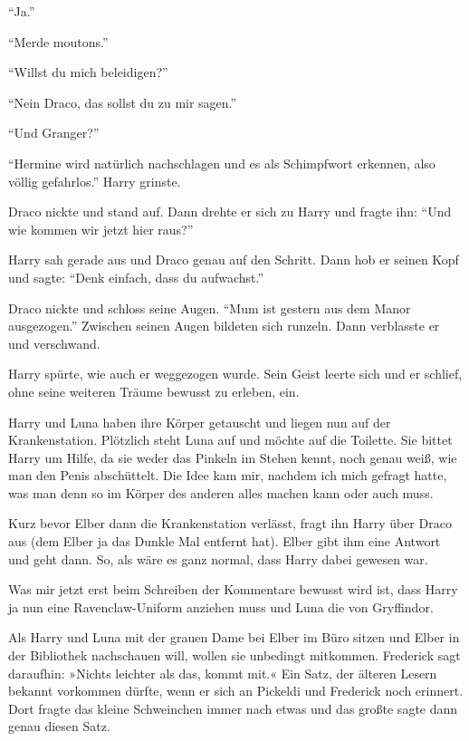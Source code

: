 \enquote{Ja.}

\enquote{Merde moutons.}

\enquote{Willst du mich beleidigen?}

\enquote{Nein Draco, das sollst du zu mir sagen.}

\enquote{Und Granger?}

\enquote{Hermine wird natürlich nachschlagen und es als Schimpfwort erkennen, also völlig gefahrlos.} Harry grinste.

Draco nickte und stand auf. Dann drehte er sich zu Harry und fragte ihn: \enquote{Und wie kommen wir jetzt hier raus?}

Harry sah gerade aus und Draco genau auf den Schritt. Dann hob er seinen Kopf und sagte: \enquote{Denk einfach, dass du aufwachst.}

Draco nickte und schloss seine Augen. \enquote{Mum ist gestern aus dem Manor ausgezogen.} Zwischen seinen Augen bildeten sich runzeln. Dann verblasste er und verschwand.

Harry spürte, wie auch er weggezogen wurde. Sein Geist leerte sich und er schlief, ohne seine weiteren Träume bewusst zu erleben, ein.




\begin{kommentar}
Harry und Luna haben ihre Körper getauscht und liegen nun auf der Krankenstation. Plötzlich steht Luna auf und möchte auf die Toilette. Sie bittet Harry um Hilfe, da sie weder das Pinkeln im Stehen kennt, noch genau weiß, wie man den Penis abschüttelt. Die Idee kam mir, nachdem ich  mich gefragt hatte, was man denn so im Körper des anderen alles machen kann oder auch muss.
\end{kommentar}

\begin{kommentar}
Kurz bevor Elber dann die Krankenstation verlässt, fragt ihn Harry über Draco aus (dem Elber ja das Dunkle Mal entfernt hat). Elber gibt ihm eine Antwort und geht dann. So, als wäre es ganz normal, dass Harry dabei gewesen war.
\end{kommentar}

\begin{kommentar}
Was mir jetzt erst beim Schreiben der Kommentare bewusst wird ist, dass Harry ja nun eine Ravenclaw-Uniform anziehen muss und Luna die von Gryffindor.
\end{kommentar}

\begin{kommentar}
Als Harry und Luna mit der grauen Dame bei Elber im Büro sitzen und Elber in der Bibliothek nachschauen will, wollen sie unbedingt mitkommen. Frederick sagt daraufhin: »Nichts leichter als das, kommt mit.« Ein Satz, der älteren Lesern bekannt vorkommen dürfte, wenn er sich an Pickeldi und Frederick noch erinnert. Dort fragte das kleine Schweinchen immer nach etwas und das großte sagte dann genau diesen Satz.
\end{kommentar}

